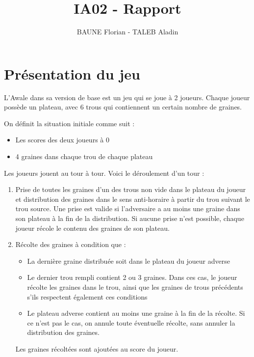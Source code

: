 \documentclass[]{article}
\title{IA02 - Rapport}
\author{BAUNE Florian - TALEB Aladin}
\date{}
\begin{document}
\maketitle

\begin{abstract}

\end{abstract}

\section{Présentation du jeu}

L'Awale dans sa version de base est un jeu qui se joue à 2 joueurs. Chaque joueur possède un plateau, avec 6 trous qui contiennent un certain nombre de graines.

On définit la situation initiale comme suit : 
\begin{itemize}
\item Les scores des deux joueurs à 0
\item 4 graines dans chaque trou de chaque plateau
\end{itemize}

Les joueurs jouent au tour à tour. Voici le déroulement d'un tour : 

\begin{enumerate}
\item Prise de toutes les graines d'un des trous non vide dans le plateau du joueur et distribution des graines dans le sens anti-horaire à partir du trou suivant le trou source.
\subitem Une prise est valide si l'adversaire a au moins une graine dans son plateau à la fin de la distribution. Si aucune prise n'est possible, chaque joueur récole le contenu des graines de son plateau.
\item Récolte des graines à condition que :
	\begin{itemize}
	\item La dernière graine distribuée soit dans le plateau du joueur adverse
	\item Le dernier trou rempli contient 2 ou 3 graines. 
	\subitem Dans ces cas, le joueur récolte les graines dans le trou, ainsi que les graines de trous précédents s'ils respectent également ces conditions
	\item Le plateau adverse contient au moins une graine à la fin de la récolte. Si ce n'est pas le cas, on annule toute éventuelle récolte, sans annuler la distribution des graines.
	\end{itemize}
	\subitem Les graines récoltées sont ajoutées au score du joueur.
\end{enumerate}
\end{document}
